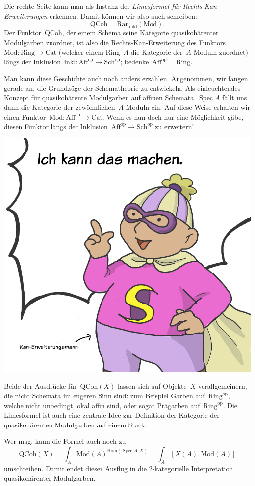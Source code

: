 \documentclass[a4paper,ngerman,12pt]{scrartcl}
\theoremstyle{definition}
\theoremstyle{plain}
\theoremstyle{remark}
\newcommand{\op}{\mathrm{op}}
\newcommand{\Hom}{\mathrm{Hom}}
\newcommand{\ul}[1]{\underline{#1}}
\DeclareMathOperator{\Spec}{Spec}
\begin{document}
Die rechte Seite kann man als Instanz der \emph{Limesformel für
Rechts-Kan-Erweiterungen} erkennen. Damit können wir also auch schreiben:
\[ \mathrm{QCoh} = \mathrm{Ran}_\mathrm{inkl}(\mathrm{Mod}). \]
Der Funktor~$\mathrm{QCoh}$, der einem Schema seine Kategorie quasikohärenter
Modulgarben zuordnet, ist also die Rechts-Kan-Erweiterung des
Funktors~$\mathrm{Mod} : \mathrm{Ring} \to \mathrm{Cat}$ (welcher einem
Ring~$A$ die Kategorie der~$A$-Moduln zuordnet) längs der
Inklusion~$\mathrm{inkl} : \mathrm{Aff}^\op \to \mathrm{Sch}^\op$;
bedenke~$\mathrm{Aff}^\op = \mathrm{Ring}$.

Man kann diese Geschichte auch noch anders erzählen. Angenommen, wir fangen
gerade an, die Grundzüge der Schematheorie zu entwickeln. Als einleuchtendes
Konzept für quasikohärente Modulgarben auf affinen Schemata~$\Spec A$ fällt uns
dann die Kategorie der gewöhnlichen~$A$-Moduln ein. Auf diese Weise erhalten
wir einen Funktor~$\mathrm{Mod} : \mathrm{Aff}^\op \to \mathrm{Cat}$. Wenn es
nun doch nur eine Möglichkeit gäbe, diesen Funktor längs der
Inklusion~$\mathrm{Aff}^\op \to \mathrm{Sch}^\op$ zu erweitern!

\begin{center}
\includegraphics[scale=0.28]{kan-erweiterungsmann}
\end{center}

Beide der Ausdrücke für~$\mathrm{QCoh}(X)$ lassen sich auf Objekte~$X$
verallgemeinern, die nicht Schemata im engeren Sinn sind: zum Beispiel Garben
auf~$\mathrm{Ring}^\op$, welche nicht unbedingt lokal affin sind, oder sogar
Prägarben auf~$\mathrm{Ring}^\op$. Die Limesformel ist auch eine zentrale Idee
zur Definition der Kategorie der quasikohärenten Modulgarben auf einem Stack.

Wer mag, kann die Formel auch noch zu
\[ \mathrm{QCoh}(X) = \int_A \mathrm{Mod}(A)^{\Hom(\Spec A, X)} =
  \int_A [\ul{X}(A), \mathrm{Mod}(A)] \]
umschreiben. Damit endet dieser Ausflug in die 2-kategorielle Interpretation
quasikohärenter Modulgarben.
\end{document}
